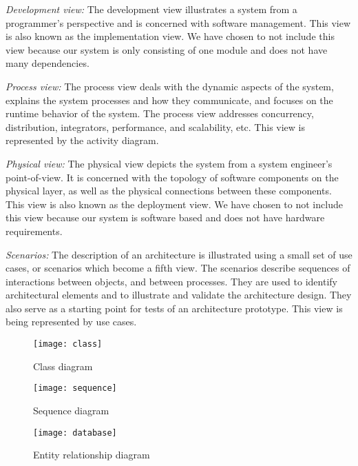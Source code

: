 \documentclass{report}
\begin{document}
\emph{Development view:} The development view illustrates a system from a programmer's perspective and is concerned with software management. This view is also known as the implementation view. We have chosen to not include this view because our system is only consisting of one module and does not have many dependencies.

\emph{Process view:} The process view deals with the dynamic aspects of the system, explains the system processes and how they communicate, and focuses on the runtime behavior of the system. The process view addresses concurrency, distribution, integrators, performance, and scalability, etc. This view is represented by the activity diagram.

\emph{Physical view:} The physical view depicts the system from a system engineer's point-of-view. It is concerned with the topology of software components on the physical layer, as well as the physical connections between these components. This view is also known as the deployment view. We have chosen to not include this view because our system is  software based and does not have hardware requirements.

\emph{Scenarios:} The description of an architecture is illustrated using a small set of use cases, or scenarios which become a fifth view. The scenarios describe sequences of interactions between objects, and between processes. They are used to identify architectural elements and to illustrate and validate the architecture design. They also serve as a starting point for tests of an architecture prototype. This view is being represented by use cases.


\begin{figure}
    \centering
    \texttt{[image: class]}
    \caption{Class diagram \label{classdiagram}}
\end{figure}

\begin{figure}
    \centering
    \texttt{[image: sequence]}
    \caption{Sequence diagram \label{sequencediagram}}
\end{figure}

\begin{figure}
    \centering
    \texttt{[image: database]}
    \caption{Entity relationship diagram \label{cldiagram}}
\end{figure}

\end{document}
